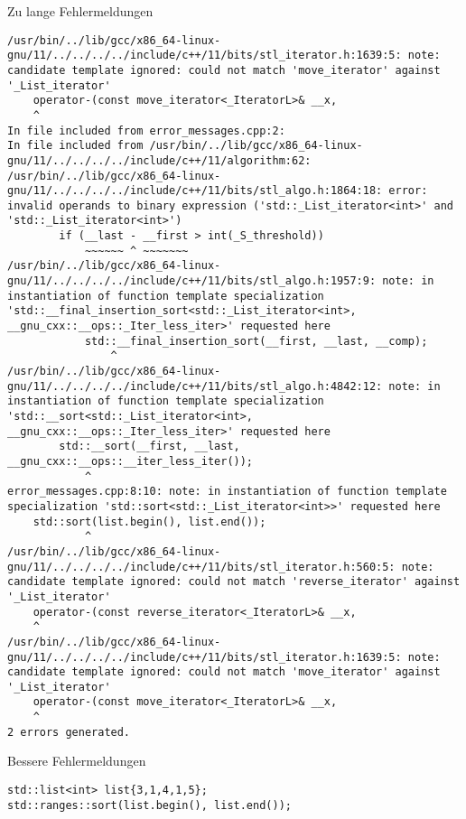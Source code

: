 \begin{frame}{Zu lange Fehlermeldungen}
\begin{verbatim}
/usr/bin/../lib/gcc/x86_64-linux-gnu/11/../../../../include/c++/11/bits/stl_iterator.h:1639:5: note: candidate template ignored: could not match 'move_iterator' against '_List_iterator'
    operator-(const move_iterator<_IteratorL>& __x,
    ^
In file included from error_messages.cpp:2:
In file included from /usr/bin/../lib/gcc/x86_64-linux-gnu/11/../../../../include/c++/11/algorithm:62:
/usr/bin/../lib/gcc/x86_64-linux-gnu/11/../../../../include/c++/11/bits/stl_algo.h:1864:18: error: invalid operands to binary expression ('std::_List_iterator<int>' and 'std::_List_iterator<int>')
        if (__last - __first > int(_S_threshold))
            ~~~~~~ ^ ~~~~~~~
/usr/bin/../lib/gcc/x86_64-linux-gnu/11/../../../../include/c++/11/bits/stl_algo.h:1957:9: note: in instantiation of function template specialization 'std::__final_insertion_sort<std::_List_iterator<int>, __gnu_cxx::__ops::_Iter_less_iter>' requested here
            std::__final_insertion_sort(__first, __last, __comp);
                ^
/usr/bin/../lib/gcc/x86_64-linux-gnu/11/../../../../include/c++/11/bits/stl_algo.h:4842:12: note: in instantiation of function template specialization 'std::__sort<std::_List_iterator<int>, __gnu_cxx::__ops::_Iter_less_iter>' requested here
        std::__sort(__first, __last, __gnu_cxx::__ops::__iter_less_iter());
            ^
error_messages.cpp:8:10: note: in instantiation of function template specialization 'std::sort<std::_List_iterator<int>>' requested here
    std::sort(list.begin(), list.end());
            ^
/usr/bin/../lib/gcc/x86_64-linux-gnu/11/../../../../include/c++/11/bits/stl_iterator.h:560:5: note: candidate template ignored: could not match 'reverse_iterator' against '_List_iterator'
    operator-(const reverse_iterator<_IteratorL>& __x,
    ^
/usr/bin/../lib/gcc/x86_64-linux-gnu/11/../../../../include/c++/11/bits/stl_iterator.h:1639:5: note: candidate template ignored: could not match 'move_iterator' against '_List_iterator'
    operator-(const move_iterator<_IteratorL>& __x,
    ^
2 errors generated.\end{verbatim}

\end{frame}

\begin{frame}[fragile]{Bessere Fehlermeldungen}

    \begin{verbatim}
std::list<int> list{3,1,4,1,5};
std::ranges::sort(list.begin(), list.end());
    \end{verbatim}
\end{frame}

